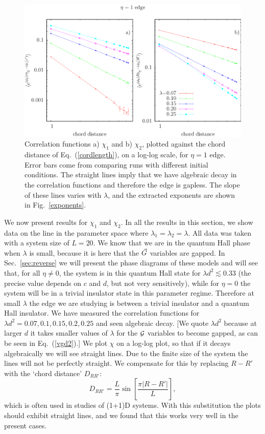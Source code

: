 \begin{figure}
\includegraphics[width=\linewidth]{figures/onecord.eps}
\caption{ Correlation functions a) $\chi_1$ and b) $\chi_2$, plotted against the chord distance of Eq.~(\ref{cordlength}), on a log-log scale, for $\eta=1$ edge.  Error bars come from comparing runs with different initial conditions.  The straight lines imply that we have algebraic decay in the correlation functions and therefore the edge is gapless.  The slope of these lines varies with $\lambda$, and the extracted exponents are shown in Fig.~\ref{exponents}.}
\label{onegood}
\end{figure}


We now present results for $\chi_1$ and $\chi_2$. In all the results in this section, we show data on the line in the parameter space where $\lambda_1=\lambda_2=\lambda$. All data was taken with a system size of $L=20$.  We know that we are in the quantum Hall phase when $\lambda$ is small, because it is here that the $\vec{G}$ variables are gapped. In Sec.~\ref{sec:reverse} we will present the phase diagrams of these models and will see that, for all $\eta \neq 0$, the system is in this quantum Hall state for $\lambda d^2\lesssim 0.33$ (the precise value depends on $c$ and $d$, but not very sensitively), while for $\eta=0$ the system will be in a trivial insulator state in this parameter regime.  Therefore at small $\lambda$ the edge we are studying is between a trivial insulator and a quantum Hall insulator. We have measured the correlation functions for $\lambda d^2=0.07,0.1,0.15,0.2,0.25$ and seen algebraic decay.  [We quote $\lambda d^2$ because at larger $d$ it takes smaller values of $\lambda$ for the $\cal{G}$ variables to become gapped, as can be seen in Eq.~(\ref{vgd2}).]  We plot $\chi$ on a log-log plot, so that if it decays algebraically we will see straight lines.  Due to the finite size of the system the lines will not be perfectly straight. We compensate for this by replacing $R-R'$ with the `chord distance' $D_{RR'}$:
\begin{equation}
D_{RR'}=\frac{L}{\pi}\sin\left[\frac{\pi |R-R'|}{L}\right],
\label{cordlength}
\end{equation}
which is often used in studies of (1+1)D systems.
With this substitution the plots should exhibit straight lines, and we found that this works very well in the present cases.


